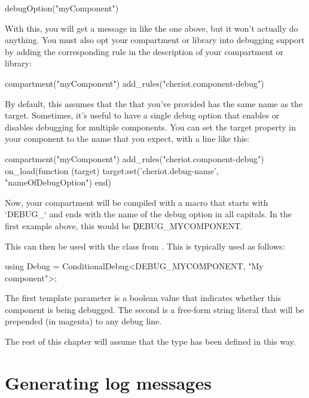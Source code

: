 \begin{luasnippet}
debugOption("myComponent")
\end{luasnippet}

With this, you will get a message in  like the one above, but it won't actually do anything.
You must also opt your compartment or library into debugging support by adding the corresponding rule in the description of your compartment or library:

\begin{luasnippet}
compartment("myComponent")
	add_rules("cheriot.component-debug")
\end{luasnippet}

By default, this assumes that the  that you've provided has the same name as the target.
Sometimes, it's useful to have a single debug option that enables or disables debugging for multiple components.
You can set the  target property in your component to the name that you expect, with a line like this:

\begin{luasnippet}
compartment("myComponent")
	add_rules("cheriot.component-debug")
	on_load(function (target)
		target:set('cheriot.debug-name', "nameOfDebugOption")
	end)
\end{luasnippet}

Now, your compartment will be compiled with a macro that starts with `DEBUG_` and ends with the name of the debug option in all capitals.
In the first example above, this would be \c{DEBUG_MYCOMPONENT}.

This can then be used with the  class from .
This is typically used as follows:

\begin{cxxsnippet}
using Debug = ConditionalDebug<DEBUG_MYCOMPONENT, "My component">;
\end{cxxsnippet}

The first template parameter is a boolean value that indicates whether this component is being debugged.
The second is a free-form string literal that will be prepended (in magenta) to any debug line.

The rest of this chapter will assume that the  type has been defined in this way.

\section{Generating log messages}

